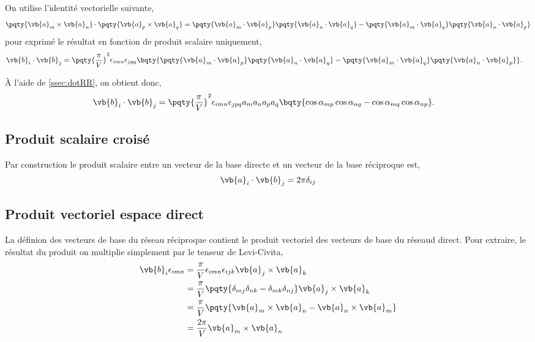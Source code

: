 On utilise l'identité vectorielle suivante,
\begin{align*}
	\pqty{ \vb{a}_m \times \vb{a}_n}\cdot\pqty{ \vb{a}_p \times \vb{a}_q} = \pqty{\vb{a}_m\cdot\vb{a}_p}\pqty{\vb{a}_n\cdot\vb{a}_q} - \pqty{\vb{a}_m\cdot\vb{a}_q}\pqty{\vb{a}_n\cdot\vb{a}_p}
\end{align*} pour exprimé le résultat en fonction de produit scalaire uniquement,
\begin{align*}
	\vb{b}_i \cdot \vb{b}_j 
	&= \pqty{\frac{\pi}{V}}^2 \epsilon_{imn} \epsilon_{jpq} \bqty{\pqty{\vb{a}_m\cdot\vb{a}_p}\pqty{\vb{a}_n\cdot\vb{a}_q} - \pqty{\vb{a}_m\cdot\vb{a}_q}\pqty{\vb{a}_n\cdot\vb{a}_p}}.
\end{align*}

À l'aide de \ref{ssec:dotRR}, on obtient donc,
\begin{align*}
	\vb{b}_i \cdot \vb{b}_j 
	&= \pqty{\frac{\pi}{V}}^2 \epsilon_{imn} \epsilon_{jpq} a_m a_n a_p a_q \bqty{\cos\alpha_{mp}\cos\alpha_{nq} - \cos\alpha_{mq}\cos\alpha_{np}}.
\end{align*}

\subsection{Produit scalaire croisé}
Par construction le produit scalaire entre un vecteur de la base directe et un vecteur de la base réciproque est,
\begin{align*}
	\vb{a}_i \cdot \vb{b}_j = 2\pi \delta_{ij}
\end{align*}

\subsection{Produit vectoriel espace direct}
La définion des vecteurs de base du réseau réciproque contient le produit vectoriel des vecteurs de base du réseaud direct. Pour extraire, le résultat du produit on multiplie simplement par le tenseur de Levi-Civita,
\begin{align*}
	\vb{b}_i\epsilon_{imn} &= \frac{\pi}{V}\epsilon_{imn} \epsilon_{ijk} \vb{a}_j \times \vb{a}_k \\
	&= \frac{\pi}{V}\pqty{\delta_{mj}\delta_{nk} - \delta_{mk}\delta_{nj}} \vb{a}_j \times \vb{a}_k \\
	&= \frac{\pi}{V}\pqty{\vb{a}_m \times \vb{a}_n - \vb{a}_n \times \vb{a}_m} \\
	&= \frac{2\pi}{V}\vb{a}_m \times \vb{a}_n
\end{align*}

